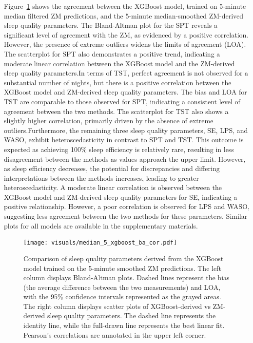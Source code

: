 \documentclass[
  super,
  preprint,
  3p]{elsarticle}
\begin{document}
Figure~\ref{fig-xgb_ba_cor} shows the agreement between the XGBoost
model, trained on 5-minute median filtered ZM predictions, and the
5-minute median-smoothed ZM-derived sleep quality parameters. The
Bland-Altman plot for the SPT reveals a significant level of agreement
with the ZM, as evidenced by a positive correlation. However, the
presence of extreme outliers widens the limits of agreement (LOA). The
scatterplot for SPT also demonstrates a positive trend, indicating a
moderate linear correlation between the XGBoost model and the ZM-derived
sleep quality parameters.In terms of TST, perfect agreement is not
observed for a substantial number of nights, but there is a positive
correlation between the XGBoost model and ZM-derived sleep quality
parameters. The bias and LOA for TST are comparable to those observed
for SPT, indicating a consistent level of agreement between the two
methods. The scatterplot for TST also shows a slightly higher
correlation, primarily driven by the absence of extreme
outliers.Furthermore, the remaining three sleep quality parameters, SE,
LPS, and WASO, exhibit heteroscedasticity in contrast to SPT and TST.
This outcome is expected as achieving 100\% sleep efficiency is
relatively rare, resulting in less disagreement between the methods as
values approach the upper limit. However, as sleep efficiency decreases,
the potential for discrepancies and differing interpretations between
the methods increases, leading to greater heteroscedasticity. A moderate
linear correlation is observed between the XGBoost model and ZM-derived
sleep quality parameters for SE, indicating a positive relationship.
However, a poor correlation is observed for LPS and WASO, suggesting
less agreement between the two methods for these parameters. Similar
plots for all models are available in the supplementary materials.

\begin{figure}[b]

{\centering \texttt{[image: visuals/median\_5\_xgboost\_ba\_cor.pdf]}

}

\caption{\label{fig-xgb_ba_cor}Comparison of sleep quality parameters
derived from the XGBoost model trained on the 5-minute smoothed ZM
predictions. The left column displays Bland-Altman plots. Dashed lines
represent the bias (the average difference between the two measurements)
and LOA, with the 95\% confidence intervals represented as the grayed
areas. The right column displays scatter plots of XGBoost-derived vs
ZM-derived sleep quality parameters. The dashed line represents the
identity line, while the full-drawn line represents the best linear fit.
Pearson's correlations are annotated in the upper left corner.}

\end{figure}
\end{document}

